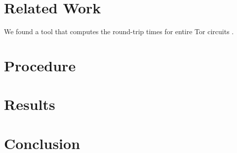 \documentclass[twocolumn,11pt]{article}
\begin{document}
\section{Related Work}

We found a tool that computes the round-trip times for entire Tor circuits \cite{rtt}.

\section{Procedure}

\section{Results}

\section{Conclusion}






\end{document}
